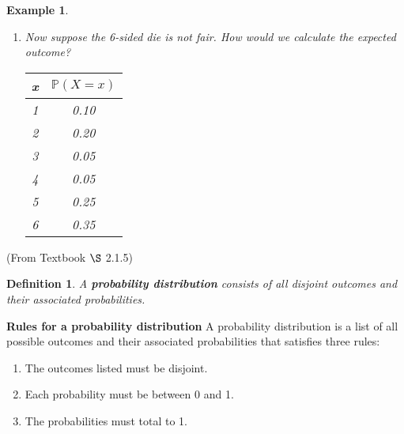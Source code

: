 \documentclass[12pt]{amsart}
\newtheorem{definition}[theorem]{Definition}
\newtheorem{example}[theorem]{Example}
\begin{document}
{\begin{example}
\begin{enumerate}
\item Now suppose the 6-sided die is not fair. How would we calculate the expected outcome?

\vspace{1cm}
\begin{tabular}{| c | c |}
  \hline                       
  x & $\mathbb{P}(X=x)$  \\
   \hline     
  1 & 0.10 \\
  2 & 0.20  \\
  3 & 0.05  \\
  4 & 0.05  \\
  5 & 0.25  \\
  6 & 0.35  \\
  \hline  
\end{tabular}

%

\vspace{2cm}
\end{enumerate}
\end{example} 

\newpage


(From Textbook $\S$ 2.1.5)
\begin{definition} A \textbf{probability distribution} consists of all disjoint outcomes and their associated probabilities.
\end{definition}

\textbf{Rules for a probability distribution} \newline
A probability distribution is a list of all possible outcomes and their associated probabilities that satisfies three rules: 
\begin{enumerate}
\setlength{\itemsep}{0mm}
\item The outcomes listed must be disjoint.
\item Each probability must be between 0 and 1.
\item The probabilities must total to 1. \vspace{1mm}
\end{enumerate}

}
\end{document}
